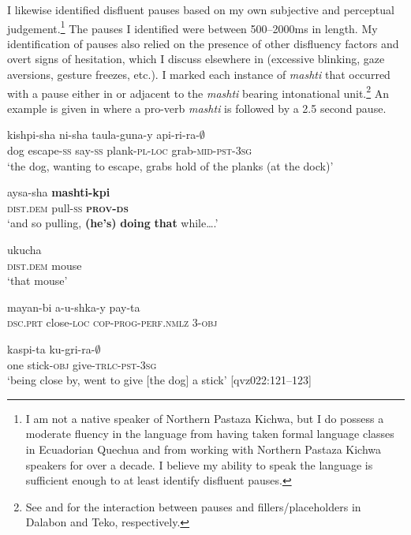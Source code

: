 \documentclass[output=paper]{langscibook}
\begin{document}
I likewise identified disfluent pauses based on my own subjective and perceptual judgement.\footnote{I am not a native speaker of Northern Pastaza Kichwa, but I do possess a moderate fluency in the language from having taken formal language classes in Ecuadorian Quechua and from working with Northern Pastaza Kichwa speakers for over a decade. I believe my ability to speak the language is sufficient enough to at least identify disfluent pauses.} The pauses I identified were between 500--2000ms in length. My identification of pauses also relied on the presence of other disfluency factors and overt signs of hesitation, which I discuss elsewhere in  (excessive blinking, gaze aversions, gesture freezes, etc.). I marked each instance of \textit{mashti} that occurred with a pause either in or adjacent to the \textit{mashti} bearing intonational unit.{\footnote{See \citet{chapters/ponsonnet} and \citet{chapters/rose} for the interaction between pauses and fillers/placeholders in Dalabon and Teko, respectively.}} An example is given in  where a pro-verb \textit{mashti} is followed by a 2.5 second pause.

\ea%
\label{ex:rice:24}
\ea \label{ex:rice:24a} 
 {kishpi-sha} {ni-sha} {taula-guna-y} {api-ri-ra-${\emptyset}$}\\
{dog} {escape-\textsc{ss}} {say-\textsc{ss}} {plank-\textsc{pl-loc}}  {grab\textsc{{}-mid-pst-3sg}}\\
\glt ‘the dog, wanting to escape, grabs hold of the planks (at the dock)’
\medskip

\ex \label{ex:rice:24b}
 {aysa-sha} {\textbf{mashti-kpi}}  {} \\
{\textsc{dist.dem}} {pull-\textsc{ss}} {\textbf{\textsc{prov-ds}}} {} \\
\glt ‘and so pulling, \textbf{(he’s)} \textbf{doing} \textbf{that} while….’
\medskip

\ex \label{ex:rice:24c}
 {ukucha}\\
{\textsc{dist.dem}}  {mouse}\\
\glt ‘that mouse’
\medskip

\ex \label{ex:rice:24d}
 {mayan-bi} {a-u-shka-y} {pay-ta} \\
{\textsc{dsc.prt}}  {close-\textsc{loc}}  {\textsc{cop-prog-perf.nmlz}}  {3-\textsc{obj}} \\
\medskip

 {kaspi-ta} {ku-gri-ra-${\emptyset}$}\\
{one}  {stick-\textsc{obj}} {give-\textsc{trlc-pst-3sg}}\\
\glt ‘being close by, went to give [the dog] a stick’ [qvz022:121--123]
\z\z
\end{document}
